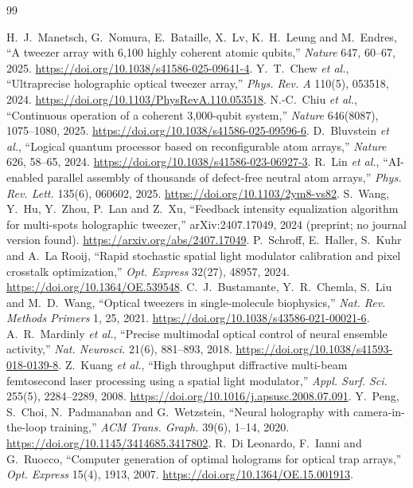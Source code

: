 \begin{thebibliography}{99}\small\raggedright
{} H.~J.~Manetsch, G.~Nomura, E.~Bataille, X.~Lv, K.~H.~Leung and M.~Endres, ``A tweezer array with 6,100 highly coherent atomic qubits,'' \emph{Nature} 647, 60--67, 2025. \url{https://doi.org/10.1038/s41586-025-09641-4}.
 Y.~T.~Chew \emph{et al.}, ``Ultraprecise holographic optical tweezer array,'' \emph{Phys. Rev. A} 110(5), 053518, 2024. \url{https://doi.org/10.1103/PhysRevA.110.053518}.
 N.-C.~Chiu \emph{et al.}, ``Continuous operation of a coherent 3,000-qubit system,'' \emph{Nature} 646(8087), 1075--1080, 2025. \url{https://doi.org/10.1038/s41586-025-09596-6}.
 D.~Bluvstein \emph{et al.}, ``Logical quantum processor based on reconfigurable atom arrays,'' \emph{Nature} 626, 58--65, 2024. \url{https://doi.org/10.1038/s41586-023-06927-3}.
 R.~Lin \emph{et al.}, ``AI-enabled parallel assembly of thousands of defect-free neutral atom arrays,'' \emph{Phys. Rev. Lett.} 135(6), 060602, 2025. \url{https://doi.org/10.1103/2ym8-vs82}.
 S.~Wang, Y.~Hu, Y.~Zhou, P.~Lan and Z.~Xu, ``Feedback intensity equalization algorithm for multi-spots holographic tweezer,'' arXiv:2407.17049, 2024 (preprint; no journal version found). \url{https://arxiv.org/abs/2407.17049}.
 P.~Schroff, E.~Haller, S.~Kuhr and A.~La Rooij, ``Rapid stochastic spatial light modulator calibration and pixel crosstalk optimization,'' \emph{Opt. Express} 32(27), 48957, 2024. \url{https://doi.org/10.1364/OE.539548}.
 C.~J.~Bustamante, Y.~R.~Chemla, S.~Liu and M.~D.~Wang, ``Optical tweezers in single-molecule biophysics,'' \emph{Nat. Rev. Methods Primers} 1, 25, 2021. \url{https://doi.org/10.1038/s43586-021-00021-6}.
 A.~R.~Mardinly \emph{et al.}, ``Precise multimodal optical control of neural ensemble activity,'' \emph{Nat. Neurosci.} 21(6), 881--893, 2018. \url{https://doi.org/10.1038/s41593-018-0139-8}.
 Z.~Kuang \emph{et al.}, ``High throughput diffractive multi-beam femtosecond laser processing using a spatial light modulator,'' \emph{Appl. Surf. Sci.} 255(5), 2284--2289, 2008. \url{https://doi.org/10.1016/j.apsusc.2008.07.091}.
 Y.~Peng, S.~Choi, N.~Padmanaban and G.~Wetzstein, ``Neural holography with camera-in-the-loop training,'' \emph{ACM Trans. Graph.} 39(6), 1--14, 2020. \url{https://doi.org/10.1145/3414685.3417802}.
 R.~Di Leonardo, F.~Ianni and G.~Ruocco, ``Computer generation of optimal holograms for optical trap arrays,'' \emph{Opt. Express} 15(4), 1913, 2007. \url{https://doi.org/10.1364/OE.15.001913}.

\end{thebibliography}
